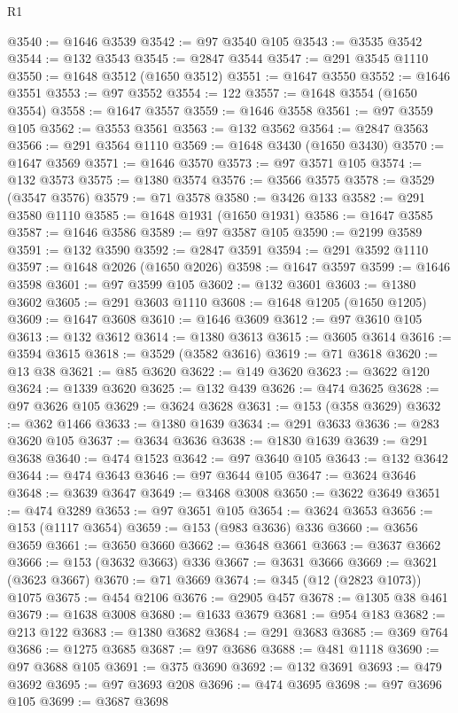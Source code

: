 \begin{lexlean}{R1}
\begin{coremodule}
{{{{{{{{{{{{{{{{{{{{{{{{{{{{{{{{{{{{{{{{{{{{{{{{{{{{{{{{{{{{{{{{{{{{{{{{{{{{{{{{{{{{{{{{{{{{{{{{{{{{{{{{{{{{{{{{{{{{{{{{{{{{{{{{{{{{{{{{{{{{{{{{{{{{{{{{{{{{{{{{{{{{{{{{{{{{{{{{{{{{{{{{{{@3540 := @1646 @3539
@3542 := @97 @3540 @105
@3543 := @3535 @3542
@3544 := @132 @3543
@3545 := @2847 @3544
@3547 := @291 @3545 @1110
@3550 := @1648 @3512 (@1650 @3512)
@3551 := @1647 @3550
@3552 := @1646 @3551
@3553 := @97 @3552
@3554 := 122
@3557 := @1648 @3554 (@1650 @3554)
@3558 := @1647 @3557
@3559 := @1646 @3558
@3561 := @97 @3559 @105
@3562 := @3553 @3561
@3563 := @132 @3562
@3564 := @2847 @3563
@3566 := @291 @3564 @1110
@3569 := @1648 @3430 (@1650 @3430)
@3570 := @1647 @3569
@3571 := @1646 @3570
@3573 := @97 @3571 @105
@3574 := @132 @3573
@3575 := @1380 @3574
@3576 := @3566 @3575
@3578 := @3529 (@3547 @3576)
@3579 := @71 @3578
@3580 := @3426 @133
@3582 := @291 @3580 @1110
@3585 := @1648 @1931 (@1650 @1931)
@3586 := @1647 @3585
@3587 := @1646 @3586
@3589 := @97 @3587 @105
@3590 := @2199 @3589
@3591 := @132 @3590
@3592 := @2847 @3591
@3594 := @291 @3592 @1110
@3597 := @1648 @2026 (@1650 @2026)
@3598 := @1647 @3597
@3599 := @1646 @3598
@3601 := @97 @3599 @105
@3602 := @132 @3601
@3603 := @1380 @3602
@3605 := @291 @3603 @1110
@3608 := @1648 @1205 (@1650 @1205)
@3609 := @1647 @3608
@3610 := @1646 @3609
@3612 := @97 @3610 @105
@3613 := @132 @3612
@3614 := @1380 @3613
@3615 := @3605 @3614
@3616 := @3594 @3615
@3618 := @3529 (@3582 @3616)
@3619 := @71 @3618
@3620 := @13 @38
@3621 := @85 @3620
@3622 := @149 @3620
@3623 := @3622 @120
@3624 := @1339 @3620
@3625 := @132 @439
@3626 := @474 @3625
@3628 := @97 @3626 @105
@3629 := @3624 @3628
@3631 := @153 (@358 @3629)
@3632 := @362 @1466
@3633 := @1380 @1639
@3634 := @291 @3633
@3636 := @283 @3620 @105
@3637 := @3634 @3636
@3638 := @1830 @1639
@3639 := @291 @3638
@3640 := @474 @1523
@3642 := @97 @3640 @105
@3643 := @132 @3642
@3644 := @474 @3643
@3646 := @97 @3644 @105
@3647 := @3624 @3646
@3648 := @3639 @3647
@3649 := @3468 @3008
@3650 := @3622 @3649
@3651 := @474 @3289
@3653 := @97 @3651 @105
@3654 := @3624 @3653
@3656 := @153 (@1117 @3654)
@3659 := @153 (@983 @3636) @336
@3660 := @3656 @3659
@3661 := @3650 @3660
@3662 := @3648 @3661
@3663 := @3637 @3662
@3666 := @153 (@3632 @3663) @336
@3667 := @3631 @3666
@3669 := @3621 (@3623 @3667)
@3670 := @71 @3669
@3674 := @345 (@12 (@2823 @1073)) @1075
@3675 := @454 @2106
@3676 := @2905 @457
@3678 := @1305 @38 @461
@3679 := @1638 @3008
@3680 := @1633 @3679
@3681 := @954 @183
@3682 := @213 @122
@3683 := @1380 @3682
@3684 := @291 @3683
@3685 := @369 @764
@3686 := @1275 @3685
@3687 := @97 @3686
@3688 := @481 @1118
@3690 := @97 @3688 @105
@3691 := @375 @3690
@3692 := @132 @3691
@3693 := @479 @3692
@3695 := @97 @3693 @208
@3696 := @474 @3695
@3698 := @97 @3696 @105
@3699 := @3687 @3698
}}}}}}}}}}}}}}}}}}}}}}}}}}}}}}}}}}}}}}}}}}}}}}}}}}}}}}}}}}}}}}}}}}}}}}}}}}}}}}}}}}}}}}}}}}}}}}}}}}}}}}}}}}}}}}}}}}}}}}}}}}}}}}}}}}}}}}}}}}}}}}}}}}}}}}}}}}}}}}}}}}}}}}}}}}}}}}}}}}}}}}}}}}
\end{coremodule}
\end{lexlean}
